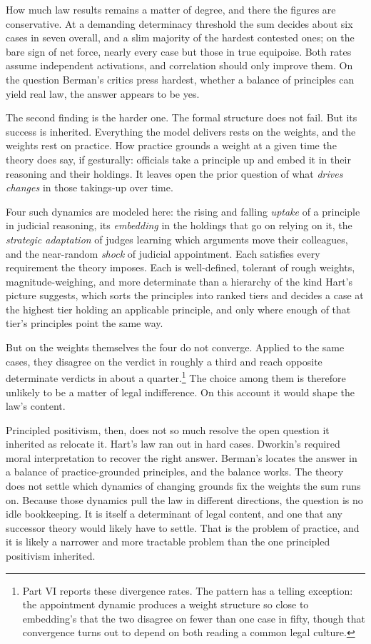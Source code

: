 How much law results remains a matter of degree, and there the
figures are conservative. At a demanding determinacy threshold the sum decides about six cases in
seven overall, and a slim majority of the hardest contested ones; on the
bare sign of net force, nearly every case but those in true equipoise. Both rates assume independent
activations, and correlation should only improve them. On the question Berman's critics press hardest, whether a balance of
principles can yield real law, the answer appears to be yes.

The second finding is the harder one. The formal structure does not fail. But
its success is inherited. Everything the model delivers rests on the
weights, and the weights rest on practice. How practice grounds a weight at
a given time the theory does say, if gesturally: officials take a principle
up and embed it in their reasoning and their holdings. It leaves open
the prior question of what \textit{drives changes} in those takings-up
over time.

Four such dynamics are modeled here: the rising and falling \textit{uptake}
of a principle in judicial reasoning, its \textit{embedding} in the holdings
that go on relying on it, the \textit{strategic adaptation} of judges
learning which arguments move their colleagues, and the near-random
\textit{shock} of judicial appointment. Each satisfies every requirement the
theory imposes. Each is well-defined, tolerant of rough weights,
magnitude-weighing, and more determinate than a hierarchy of the kind Hart's picture suggests, which
sorts the principles into ranked tiers and decides a case at the highest tier
holding an applicable principle, and only where enough of that tier's
principles point the same way.

But on the weights themselves the four do not converge. Applied to the same
cases, they disagree on the verdict in roughly a third and reach
opposite determinate verdicts in about a quarter.\footnote{Part VI reports
these divergence rates. The pattern has a telling exception: the appointment
dynamic produces a weight structure so close to embedding's that the two
disagree on fewer than one case in fifty, though that convergence turns out
to depend on both reading a common legal culture.} The choice among them is therefore unlikely to be a matter of legal
indifference. On this account it would shape the law's content.

Principled positivism, then, does not so much resolve the open question it
inherited as relocate it. Hart's law ran out in hard cases. Dworkin's
required moral interpretation to recover the right answer. Berman's locates
the answer in a balance of practice-grounded principles, and the balance
works. The theory does not settle which dynamics of changing grounds
fix the weights the sum runs on. Because those dynamics pull the law in different directions, the question is
no idle bookkeeping. It is itself a determinant of legal content, and one
that any successor theory would likely have to settle. That is the problem of practice, and it is likely a narrower and more
tractable problem than the one principled positivism inherited.

